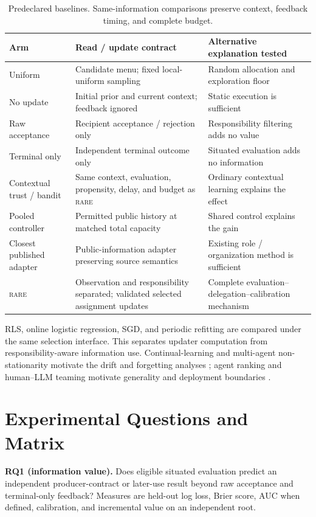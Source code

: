 \documentclass[sigconf,anonymous]{aamas}
\newcommand{\rare}{\textsc{rare}}
\begin{document}
\begin{table}[t]
\centering\scriptsize
\setlength{\tabcolsep}{3pt}
\begin{tabular}{p{}p{}p{}}
\toprule
Arm & Read / update contract & Alternative explanation tested \\
\midrule
Uniform & Candidate menu; fixed local-uniform sampling & Random allocation and exploration floor \\
No update & Initial prior and current context; feedback ignored & Static execution is sufficient \\
Raw acceptance & Recipient acceptance / rejection only & Responsibility filtering adds no value \\
Terminal only & Independent terminal outcome only & Situated evaluation adds no information \\
Contextual trust / bandit & Same context, evaluation, propensity, delay, and budget as \rare{} & Ordinary contextual learning explains the effect \\
Pooled controller & Permitted public history at matched total capacity & Shared control explains the gain \\
Closest published adapter & Public-information adapter preserving source semantics & Existing role / organization method is sufficient \\
\rare{} & Observation and responsibility separated; validated selected assignment updates & Complete evaluation--delegation--calibration mechanism \\
\bottomrule
\end{tabular}
\caption{Predeclared baselines. Same-information comparisons preserve context, feedback timing, and complete budget.}
\label{tab:baselines}
\end{table}

RLS, online logistic regression, SGD, and periodic refitting are compared under the same selection interface. This separates updater computation from responsibility-aware information use. Continual-learning and multi-agent non-stationarity motivate the drift and forgetting analyses \cite{khetarpal2022continual,hernandezleal2017nonstationarity}; agent ranking and human--LLM teaming motivate generality and deployment boundaries \cite{lanctot2025soft,yurrita2026guidelines}.

\section{Experimental Questions and Matrix}
\textbf{RQ1 (information value).} Does eligible situated evaluation predict an independent producer-contract or later-use result beyond raw acceptance and terminal-only feedback? Measures are held-out log loss, Brier score, AUC when defined, calibration, and incremental value on an independent root.
\end{document}
